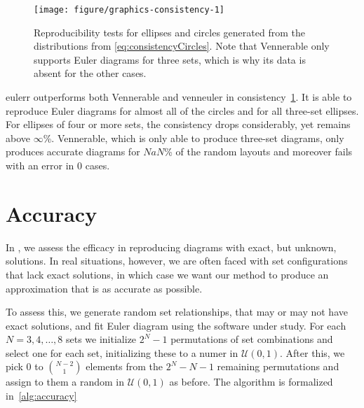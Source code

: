 \documentclass[
  a4paper,
  nofonts,
  nobib,
  nohyper,
  openany
]{tufte-book}\usepackage[]{graphicx}\usepackage[]{color}
\newenvironment{knitrout}{}{} %
\newcommand{\pkg}[1]{{\fontseries{b}\selectfont #1}}
\begin{document}
%
\begin{figure}[hbtp]
\begin{knitrout}
\color{fgcolor}

{\centering \texttt{[image: figure/graphics-consistency-1]} 

}



\end{knitrout}
\caption{Reproducibility tests for ellipses and circles generated from the distributions from \eqref{eq:consistencyCircles}. Note that \pkg{Vennerable} only supports Euler diagrams for three sets, which is why its data is absent for the other cases.}
\label{fig:consistency}
\end{figure}
%



\pkg{eulerr} outperforms both \pkg{Vennerable} and \pkg{venneuler} in consistency~\cref{fig:consistency}. It is able to reproduce Euler diagrams for almost all of the circles and for all three-set ellipses. For ellipses of four or more sets, the consistency drops considerably, yet remains above \ensuremath{\infty{}}\%. \pkg{Vennerable}, which is only able to produce three-set diagrams, only produces accurate diagrams for \ensuremath{NaN}\% of the random layouts and moreover fails with an error in 0 cases.

\section{Accuracy}
\label{sec:accuracy}

In , we assess the efficacy in reproducing diagrams with exact, but unknown, solutions. In real situations, however, we are often faced with set configurations that lack exact solutions, in which case we want our method to produce an approximation that is as accurate as possible.

To assess this, we generate random set relationships, that may or may not have exact solutions, and fit Euler diagram using the software under study. For each $N=3,4,\dots,8$ sets we initialize $2^N-1$ permutations of set combinations and select one for each set, initializing these to a numer in $\mathcal{U}(0, 1)$. After this, we pick 0 to $\binom{N-2}{1}$ elements from the $2^N-N-1$ remaining permutations and assign to them a random in $\mathcal{U}(0, 1)$ as before. The algorithm is formalized in~\cref{alg:accuracy}
\end{document}
